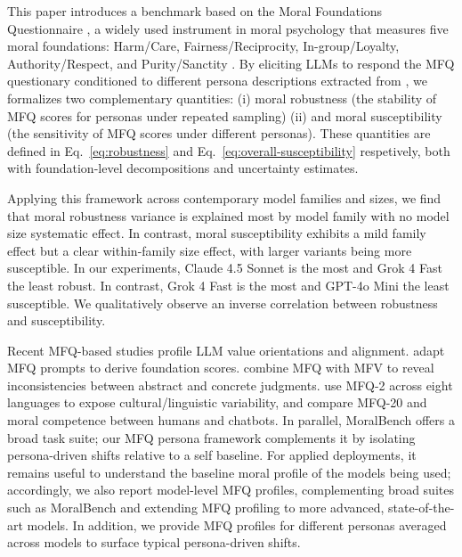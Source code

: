\documentclass{article}
\begin{document}
This paper introduces a benchmark based on the Moral Foundations Questionnaire \citep{moralfoundations2017questionnaires}, a widely used instrument in moral psychology that measures five moral foundations: Harm/Care, Fairness/Reciprocity, In-group/Loyalty, Authority/Respect, and Purity/Sanctity \citep{graham2009liberals,haidt2007when,moralfoundations2017questionnaires}. By eliciting LLMs to respond the MFQ questionary conditioned to different persona descriptions extracted from \citep{ge2025scalingsyntheticdatacreation}, we formalizes two complementary quantities: (i) moral robustness (the stability of MFQ scores for personas under repeated sampling) (ii) and moral susceptibility (the sensitivity of MFQ scores under different personas). These quantities are defined in Eq.~\eqref{eq:robustness} and Eq.~\eqref{eq:overall-susceptibility} respetively, both with foundation-level decompositions and uncertainty estimates.

Applying this framework across contemporary model families and sizes, we find that moral robustness variance is explained most by model family with no model size systematic effect. In contrast, moral susceptibility exhibits a mild family effect but a clear within-family size effect, with larger variants being more susceptible. In our experiments, Claude 4.5 Sonnet is the most and Grok 4 Fast the least robust. In contrast, Grok 4 Fast is the most and GPT-4o Mini the least susceptible. We qualitatively observe an inverse correlation between robustness and susceptibility.

Recent MFQ-based studies profile LLM value orientations and alignment. \citet{abdulhai-etal-2024-moral} adapt MFQ prompts to derive foundation scores. \citet{nunes2024hypocrites} combine MFQ with MFV to reveal inconsistencies between abstract and concrete judgments. \citet{aksoy2024whose} use MFQ-2 across eight languages to expose cultural/linguistic variability, and \citet{bajpai2024insights} compare MFQ-20 and moral competence between humans and chatbots. In parallel, MoralBench \citep{ji2025moralbenchmoralevaluationllms} offers a broad task suite; our MFQ persona framework complements it by isolating persona-driven shifts relative to a self baseline. For applied deployments, it remains useful to understand the baseline moral profile of the models being used; accordingly, we also report model-level MFQ profiles, complementing broad suites such as MoralBench and extending MFQ profiling to more advanced, state-of-the-art models. In addition, we provide MFQ profiles for different personas averaged across models to surface typical persona-driven shifts.
\end{document}
